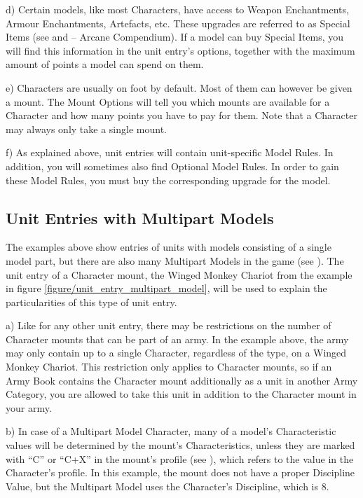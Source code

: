 d) Certain models, like most Characters, have access to Weapon Enchantments, Armour Enchantments, Artefacts, etc. These upgrades are referred to as Special Items (see  and \nameofthegame{} -- Arcane Compendium). If a model can buy Special Items, you will find this information in the unit entry's options, together with the maximum amount of points a model can spend on them.

e) Characters are usually on foot by default. Most of them can however be given a mount. The Mount Options will tell you which mounts are available for a Character and how many points you have to pay for them. Note that a Character may always only take a single mount.

f) As explained above, unit entries will contain unit-specific Model Rules. In addition, you will sometimes also find Optional Model Rules. In order to gain these Model Rules, you must buy the corresponding upgrade for the model.

\subsection{Unit Entries with Multipart Models}

The examples above show entries of units with models consisting of a single model part, but there are also many Multipart Models in the game (see ). The unit entry of a Character mount, the Winged Monkey Chariot from the example in figure \ref{figure/unit_entry_multipart_model}, will be used to explain the particularities of this type of unit entry.

\columnbreak

a) Like for any other unit entry, there may be restrictions on the number of Character mounts that can be part of an army. In the example above, the army may only contain up to a single Character, regardless of the type, on a Winged Monkey Chariot. This restriction only applies to Character mounts, so if an Army Book contains the Character mount additionally as a unit in another Army Category, you are allowed to take this unit in addition to the Character mount in your army.

b) In case of a Multipart Model Character, many of a model's Characteristic values will be determined by the mount's Characteristics, unless they are marked with \enquote{C} or \enquote{C+X} in the mount's profile (see ), which refers to the value in the Character's profile. In this example, the mount does not have a proper Discipline Value, but the Multipart Model uses the Character's Discipline, which is 8.

